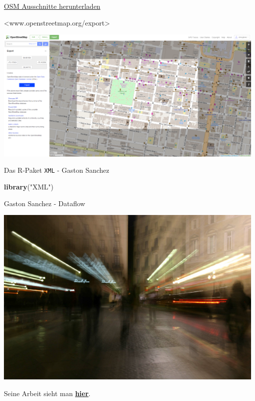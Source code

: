 \documentclass[ignorenonframetext,]{beamer}
\newenvironment{Shaded}{\begin{snugshade}}{\end{snugshade}}
\newcommand{\KeywordTok}[1]{\textcolor[rgb]{0.13,0.29,0.53}{\textbf{#1}}}
\newcommand{\NormalTok}[1]{#1}
\newcommand{\StringTok}[1]{\textcolor[rgb]{0.31,0.60,0.02}{#1}}
\begin{document}
\begin{frame}{\href{http://www.openstreetmap.org/export}{OSM Ausschnitte
herunterladen}}
\protect\hypertarget{osm-ausschnitte-herunterladen}{}

\textless{}www.openstreetmap.org/export\textgreater{}

\includegraphics{figure/openstreetmap_export-1024x505.png}

\end{frame}

\begin{frame}[fragile]{Das R-Paket \texttt{XML} - Gaston Sanchez}
\protect\hypertarget{das-r-paket-xml---gaston-sanchez}{}

\begin{Shaded}
\begin{Highlighting}[]
\KeywordTok{library}\NormalTok{(}\StringTok{"XML"}\NormalTok{)}
\end{Highlighting}
\end{Shaded}

\begin{block}{Gaston Sanchez - Dataflow}

\includegraphics{figure/GastonSanchez2.png}

Seine Arbeit sieht man \href{http://gastonsanchez.com/}{\textbf{hier}}.

\end{block}

\end{frame}
\end{document}
